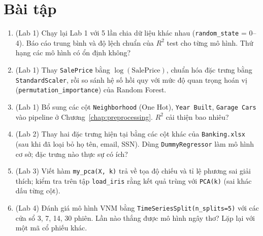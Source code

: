 \section{Bài tập}
\begin{enumerate}
    \item (Lab 1) Chạy lại Lab 1 với 5 lần chia dữ liệu khác nhau (\texttt{random\_state} = 0--4). Báo cáo trung bình và độ lệch chuẩn của $R^2$ test cho từng mô hình. Thứ hạng các mô hình có ổn định không?
    \item (Lab 1) Thay \texttt{SalePrice} bằng $\log(\text{SalePrice})$, chuẩn hóa đặc trưng bằng \texttt{StandardScaler}, rồi so sánh hệ số hồi quy với mức độ quan trọng hoán vị (\texttt{permutation\_\allowbreak importance}) của Random Forest.
    \item (Lab 1) Bổ sung các cột \texttt{Neighborhood} (One Hot), \texttt{Year Built}, \texttt{Garage Cars} vào pipeline ở Chương~\ref{chap:preprocessing}. $R^2$ cải thiện bao nhiêu?
    \item (Lab 2) Thay hai đặc trưng hiện tại bằng các cột khác của \texttt{Banking.xlsx} (sau khi đã loại bỏ họ tên, email, SSN). Dùng \texttt{DummyRegressor} làm mô hình cơ sở; đặc trưng nào thực sự có ích?
    \item (Lab 3) Viết hàm \texttt{my\_pca(X, k)} trả về tọa độ chiếu và tỉ lệ phương sai giải thích; kiểm tra trên tập \texttt{load\_iris} rằng kết quả trùng với \texttt{PCA(k)} (sai khác dấu từng cột).
    \item (Lab 4) Đánh giá mô hình VNM bằng \texttt{TimeSeriesSplit(n\_splits=5)} với các cửa sổ 3, 7, 14, 30 phiên. Lần nào thắng được mô hình ngây thơ? Lặp lại với một mã cổ phiếu khác.
\end{enumerate}

